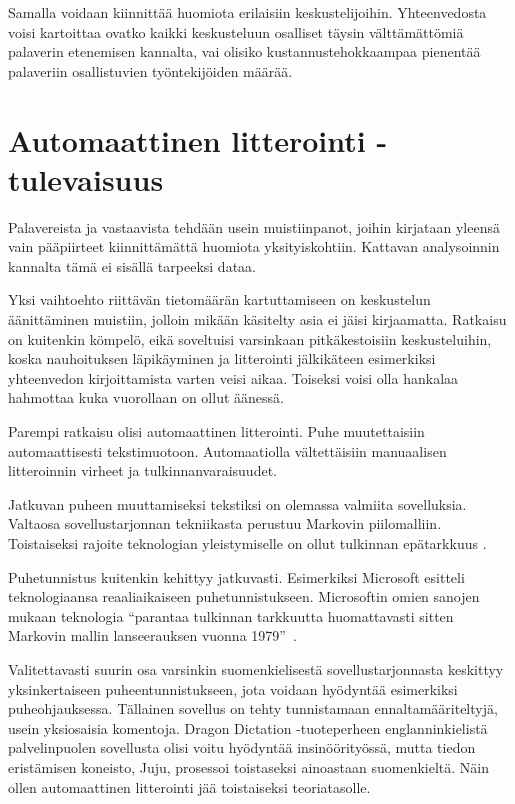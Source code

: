 \documentclass[11pt,a4paper,oneside]{memoir}
\begin{document}
Samalla voidaan kiinnittää huomiota erilaisiin keskustelijoihin. Yhteenvedosta voisi kartoittaa ovatko kaikki keskusteluun osalliset täysin välttämättömiä palaverin etenemisen kannalta, vai olisiko kustannustehokkaampaa pienentää palaveriin osallistuvien työntekijöiden määrää.

\section{Automaattinen litterointi - tulevaisuus\label{automaattinen-litterointi}}
Palavereista ja vastaavista tehdään usein muistiinpanot, joihin kirjataan yleensä vain pääpiirteet kiinnittämättä huomiota yksityiskohtiin. Kattavan analysoinnin kannalta tämä ei sisällä tarpeeksi dataa.

Yksi vaihtoehto riittävän tietomäärän kartuttamiseen on keskustelun äänittäminen muistiin, jolloin mikään käsitelty asia ei jäisi kirjaamatta. Ratkaisu on kuitenkin kömpelö, eikä soveltuisi varsinkaan pitkäkestoisiin keskusteluihin, koska nauhoituksen läpikäyminen ja litterointi jälkikäteen esimerkiksi yhteenvedon kirjoittamista varten veisi aikaa. Toiseksi voisi olla hankalaa hahmottaa kuka vuorollaan on ollut äänessä.

Parempi ratkaisu olisi automaattinen litterointi. Puhe muutettaisiin automaattisesti tekstimuotoon. Automaatiolla vältettäisiin manuaalisen litteroinnin virheet ja tulkinnanvaraisuudet.

Jatkuvan puheen muuttamiseksi tekstiksi on olemassa valmiita sovelluksia. Valtaosa sovellustarjonnan tekniikasta perustuu Markovin piilomalliin. Toistaiseksi rajoite teknologian yleistymiselle on ollut tulkinnan epätarkkuus \cite{lai-lu-chao:performance-analysis-of-sr-software}.
 
Puhetunnistus kuitenkin kehittyy jatkuvasti. Esimerkiksi Microsoft esitteli teknologiaansa reaaliaikaiseen puhetunnistukseen. Microsoftin omien sanojen mukaan teknologia  \textquotedblleft parantaa tulkinnan tarkkuutta huomattavasti sitten Markovin mallin lanseerauksen vuonna 1979\textquotedblright ~\cite{microsoft:breakthrough-in-speech-translation-technology}.

Valitettavasti suurin osa varsinkin suomenkielisestä sovellustarjonnasta keskittyy yksinkertaiseen puheentunnistukseen, jota voidaan hyödyntää esimerkiksi puheohjauksessa. Tällainen sovellus on tehty tunnistamaan ennaltamääriteltyjä, usein yksiosaisia komentoja. Dragon Dictation -tuoteperheen englanninkielistä palvelinpuolen sovellusta olisi voitu hyödyntää insinöörityössä, mutta tiedon eristämisen koneisto, Juju, prosessoi toistaseksi ainoastaan suomenkieltä. Näin ollen automaattinen litterointi jää toistaiseksi teoriatasolle.
\end{document}
